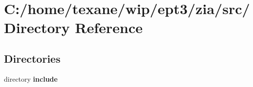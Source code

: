 \section{C:/home/texane/wip/ept3/zia/src/ Directory Reference}
\label{dir_C_3A_2Fhome_2Ftexane_2Fwip_2Fept3_2Fzia_2Fsrc_2F}
\subsection*{Directories}
\begin{CompactItemize}
\item 
directory {\bf include}
\end{CompactItemize}
